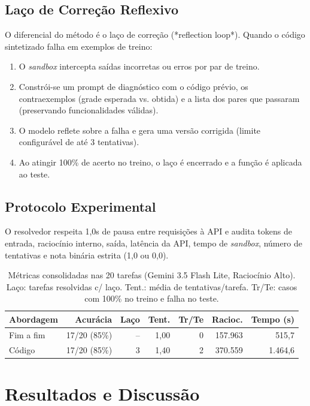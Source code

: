 \documentclass{article}
\begin{document}
\subsection{Laço de Correção Reflexivo}
O diferencial do método é o laço de correção (*reflection loop*). Quando o código sintetizado falha em exemplos de treino:
\begin{enumerate}
    \item O \textit{sandbox} intercepta saídas incorretas ou erros por par de treino.
    \item Constrói-se um prompt de diagnóstico com o código prévio, os contraexemplos (grade esperada vs. obtida) e a lista dos pares que passaram (preservando funcionalidades válidas).
    \item O modelo reflete sobre a falha e gera uma versão corrigida (limite configurável de até 3 tentativas).
    \item Ao atingir 100\% de acerto no treino, o laço é encerrado e a função é aplicada ao teste.
\end{enumerate}

\subsection{Protocolo Experimental}
O resolvedor respeita 1,0s de pausa entre requisições à API e audita tokens de entrada, raciocínio interno, saída, latência da API, tempo de \textit{sandbox}, número de tentativas e nota binária estrita (1,0 ou 0,0).

\begin{table}[t]
  \centering
  \scriptsize
  \setlength{\tabcolsep}{2.0pt}
  \begin{tabular}{lrrrrrr}
    \toprule
    Abordagem & Acurácia & Laço & Tent. & Tr/Te & Racioc. & Tempo (s) \\
    \midrule
    Fim a fim & 17/20 (85\%) & -- & 1,00 & 0 & 157.963 & 515,7 \\
    Código    & 17/20 (85\%) & 3  & 1,40 & 2 & 370.559 & 1.464,6 \\
    \bottomrule
  \end{tabular}
  \caption{Métricas consolidadas nas 20 tarefas (Gemini 3.5 Flash Lite, Raciocínio Alto). Laço: tarefas resolvidas c/ laço. Tent.: média de tentativas/tarefa. Tr/Te: casos com 100\% no treino e falha no teste.}
  \label{tab:resultados}
\end{table}

\section{Resultados e Discussão}
\end{document}
